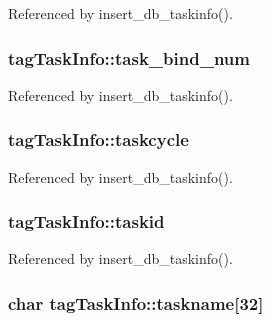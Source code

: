 Referenced by insert\-\_\-db\-\_\-taskinfo().

\hypertarget{structtagTaskInfo_a91b0f3c32018122d00609a9307ab67eb}{
\subsubsection[{task\-\_\-bind\-\_\-num}]{ tag\-Task\-Info\-::task\-\_\-bind\-\_\-num}}\label{structtagTaskInfo_a91b0f3c32018122d00609a9307ab67eb}


Referenced by insert\-\_\-db\-\_\-taskinfo().

\hypertarget{structtagTaskInfo_aa43bae87b881ca9f8814bd00091bd7b2}{
\subsubsection[{taskcycle}]{ tag\-Task\-Info\-::taskcycle}}\label{structtagTaskInfo_aa43bae87b881ca9f8814bd00091bd7b2}


Referenced by insert\-\_\-db\-\_\-taskinfo().

\hypertarget{structtagTaskInfo_a155f2801679af8da2a94ccd3f04257c1}{
\subsubsection[{taskid}]{ tag\-Task\-Info\-::taskid}}\label{structtagTaskInfo_a155f2801679af8da2a94ccd3f04257c1}


Referenced by insert\-\_\-db\-\_\-taskinfo().

\hypertarget{structtagTaskInfo_ab76b49c5ef17884a13a8629d1fbbd9e2}{
\subsubsection[{taskname}]{\setlength{\rightskip}{0pt plus 5cm}char tag\-Task\-Info\-::taskname\mbox{[}32\mbox{]}}}\label{structtagTaskInfo_ab76b49c5ef17884a13a8629d1fbbd9e2}


